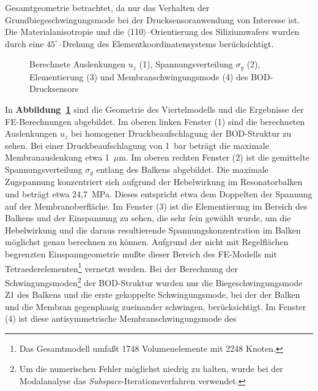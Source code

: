 Gesamtgeometrie betrachtet, da nur das Verhalten der
Grundbiegeschwingungsmode bei der Drucksensoranwendung von Interesse ist.
Die Materialanisotropie und die $\langle$110$\rangle$--Orientierung des
Siliziumwafers
wurden durch eine $45^{\circ}$--Drehung des Elementkoordinatensystems
berücksichtigt.\\
\begin{figure}[htb]

\begin{center}

\setabbsedr
\end{center}

\caption{\label{abbbodansys}
 Berechnete Auslenkungen $u_{z}$ (1), Spannungsverteilung $\sigma_{y}$ (2),
 Elementierung (3) und Membranschwingungsmode (4) des BOD-Drucksensors}
\end{figure}
In {\bf Abbildung~\ref{abbbodansys}} sind die Geometrie des Viertelmodells
und die Ergebnisse der FE-Berechnungen
abgebildet. Im oberen linken Fenster (1) sind die berechneten Auslenkungen
$u_{z}$ bei homogener Druckbeaufschlagung der BOD-Struktur zu sehen.
Bei einer Druckbeaufschlagung von 1~bar beträgt die maximale
Membranauslenkung etwa
1~$\mu$m. Im oberen rechten Fenster (2) ist die gemittelte
Spannungsverteilung $\sigma_{y}$ entlang des Balkens abgebildet.
Die maximale Zugspannung konzentriert sich aufgrund der Hebelwirkung im
Resonatorbalken und beträgt etwa 24,7~MPa. Dieses entspricht
etwa dem Doppelten
der Spannung auf der Membranoberfläche. Im Fenster (3) ist die Elementierung
im Bereich des Balkens und der Einspannung zu sehen, die sehr fein gewählt
wurde, um die Hebelwirkung und die daraus resultierende
Spannungskonzentration im Balken möglichst genau berechnen zu können.
Aufgrund der nicht mit Regelflächen begrenzten Einspanngeometrie mußte
dieser Bereich des FE-Modells mit Tetraederelementen\footnote{Das
Gesamtmodell umfaßt 1748 Volumenelemente mit 2248 Knoten.}
vernetzt werden. Bei der Berechnung der Schwingungsmoden\footnote{Um die
numerischen Fehler möglichst niedrig zu halten, wurde bei der Modalanalyse
das {\em Subspace}-Iterationsverfahren verwendet.}
der BOD-Struktur wurden nur die Biegeschwingungsmode Z1 des Balkens und
die erste gekoppelte Schwingungsmode, bei der der Balken und die Membran
gegenphasig zueinander schwingen, berücksichtigt.
Im Fenster (4) ist diese antisymmetrische Membranschwingungsmode des
